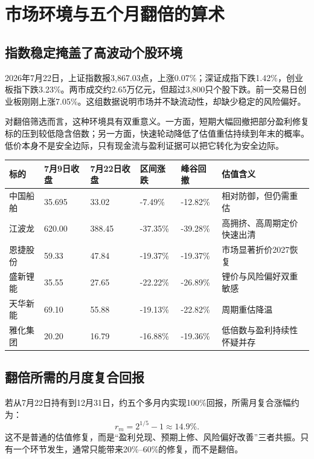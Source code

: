 \chapter{市场环境与五个月翻倍的算术}

\section{指数稳定掩盖了高波动个股环境}

2026年7月22日，上证指数报3,867.03点，上涨0.07\%；深证成指下跌1.42\%，创业板指下跌3.23\%。两市成交约2.65万亿元，但超过3,800只个股下跌。前一交易日创业板刚刚上涨7.05\%。这组数据说明市场并不缺流动性，却缺少稳定的风险偏好。

对翻倍筛选而言，这种环境具有双重意义。一方面，短期大幅回撤把部分盈利修复标的压到较低隐含倍数；另一方面，快速轮动降低了估值重估持续到年末的概率。低价本身不是安全边际，只有现金流与盈利证据可以把它转化为安全边际。

\begin{exhibitbox}
\small
\begin{tabularx}{\exhibitboxwidth}{L{2.3cm} R{1.5cm} R{1.5cm} R{1.5cm} R{1.7cm} X}
\toprule
标的 & 7月9日收盘 & 7月22日收盘 & 区间涨跌 & 峰谷回撤 & 估值含义 \\
\midrule
中国船舶 & 35.695 & 33.02 & -7.49\% & -12.82\% & 相对防御，但仍需重估 \\
江波龙 & 620.00 & 388.45 & -37.35\% & -39.28\% & 高拥挤、高周期定价快速出清 \\
恩捷股份 & 59.33 & 47.84 & -19.37\% & -19.37\% & 市场显著折价2027恢复 \\
盛新锂能 & 35.55 & 27.65 & -22.22\% & -26.89\% & 锂价与风险偏好双重敏感 \\
天华新能 & 69.10 & 55.88 & -19.13\% & -22.82\% & 周期重估降温 \\
雅化集团 & 20.20 & 16.79 & -16.88\% & -19.36\% & 低倍数与盈利持续性怀疑并存 \\
\bottomrule
\end{tabularx}
\end{exhibitbox}

\section{翻倍所需的月度复合回报}

若从7月22日持有到12月31日，约五个多月内实现100\%回报，所需月复合涨幅约为：
\[
  r_m = 2^{1/5}-1 \approx 14.9\%.
\]
这不是普通的估值修复，而是“盈利兑现、预期上修、风险偏好改善”三者共振。只有一个环节发生，通常只能带来20\%--60\%的修复，而不是翻倍。

